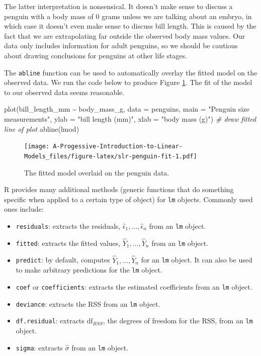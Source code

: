 \documentclass[
]{book}
\newenvironment{Shaded}{\begin{snugshade}}{\end{snugshade}}
\newcommand{\AttributeTok}[1]{\textcolor[rgb]{0.77,0.63,0.00}{#1}}
\newcommand{\CommentTok}[1]{\textcolor[rgb]{0.56,0.35,0.01}{\textit{#1}}}
\newcommand{\FunctionTok}[1]{\textcolor[rgb]{0.00,0.00,0.00}{#1}}
\newcommand{\NormalTok}[1]{#1}
\newcommand{\SpecialCharTok}[1]{\textcolor[rgb]{0.00,0.00,0.00}{#1}}
\newcommand{\StringTok}[1]{\textcolor[rgb]{0.31,0.60,0.02}{#1}}
\providecommand{\tightlist}{%
  \setlength{\itemsep}{0pt}\setlength{\parskip}{0pt}}
\theoremstyle{definition}
\theoremstyle{definition}
\theoremstyle{definition}
\theoremstyle{definition}
\theoremstyle{remark}
\begin{document}
The latter interpretation is nonsensical. It doesn't make sense to discuss a penguin with a body mass of 0 grams unless we are talking about an embryo, in which case it doesn't even make sense to discuss bill length. This is caused by the fact that we are extrapolating far outside the observed body mass values. Our data only includes information for adult penguins, so we should be cautious about drawing conclusions for penguins at other life stages.

The \texttt{abline} function can be used to automatically overlay the fitted model on the observed data. We run the code below to produce Figure \ref{fig:slr-penguin-fit}. The fit of the model to our observed data seems reasonable.

\begin{Shaded}
\begin{Highlighting}[]
\FunctionTok{plot}\NormalTok{(bill\_length\_mm }\SpecialCharTok{\textasciitilde{}}\NormalTok{ body\_mass\_g, }\AttributeTok{data =}\NormalTok{ penguins, }\AttributeTok{main =} \StringTok{"Penguin size measurements"}\NormalTok{,}
     \AttributeTok{ylab =} \StringTok{"bill length (mm)"}\NormalTok{, }\AttributeTok{xlab =} \StringTok{"body mass (g)"}\NormalTok{)}
\CommentTok{\# draw fitted line of plot}
\FunctionTok{abline}\NormalTok{(lmod)}
\end{Highlighting}
\end{Shaded}

\begin{figure}
\centering
\texttt{[image: A-Progessive-Introduction-to-Linear-Models\_files/figure-latex/slr-penguin-fit-1.pdf]}
\caption{\label{fig:slr-penguin-fit}The fitted model overlaid on the penguin data.}
\end{figure}

R provides many additional methods (generic functions that do something specific when applied to a certain type of object) for \texttt{lm} objects. Commonly used ones include:

\begin{itemize}
\tightlist
\item
  \texttt{residuals}: extracts the residuals, \(\hat{\epsilon}_1, \ldots, \hat{\epsilon}_n\) from an \texttt{lm} object.
\item
  \texttt{fitted}: extracts the fitted values, \(\hat{Y}_1, \ldots, \hat{Y}_n\) from an \texttt{lm} object.
\item
  \texttt{predict}: by default, computes \(\hat{Y}_1, \ldots, \hat{Y}_n\) for an \texttt{lm} object. It can also be used to make arbitrary predictions for the \texttt{lm} object.
\item
  \texttt{coef} or \texttt{coefficients}: extracts the estimated coefficients from an \texttt{lm} object.
\item
  \texttt{deviance}: extracts the RSS from an \texttt{lm} object.
\item
  \texttt{df.residual}: extracts \(\mathrm{df}_{RSS}\), the degrees of freedom for the RSS, from an \texttt{lm} object.
\item
  \texttt{sigma}: extracts \(\hat{\sigma}\) from an \texttt{lm} object.
\end{itemize}
\end{document}
